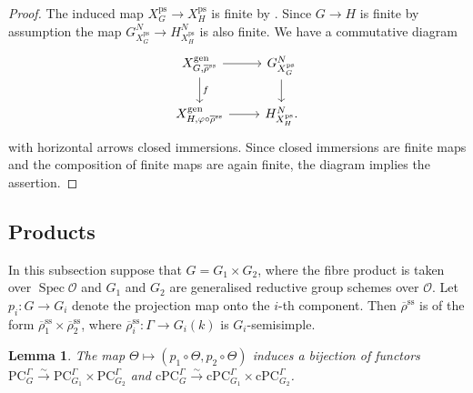 \documentclass{amsart}
\newtheorem{lem}[prop]{Lemma}
\theoremstyle{definition}
\theoremstyle{remark}
\DeclareMathOperator{\Spec}{Spec}
\newcommand{\OO}{\mathcal O}
\newcommand{\rhobar}{\overline{\rho}}
\newcommand{\ps}{\mathrm{ps}}
\newcommand{\gen}{\mathrm{gen}}
\newcommand{\rhobarss}{\rhobar^{\mathrm{ss}}}
\newcommand{\PC}{\mathrm{PC}}
\newcommand{\cPC}{\mathrm{cPC}}
\begin{document}
\begin{proof} The induced map $X^{\ps}_G \rightarrow X^{\ps}_H$ is finite by . Since 
$G\rightarrow H$ is finite by assumption the map $G^N_{X^{\ps}_G}\rightarrow H^N_{X^{\ps}_H}$ is also 
finite. We have a commutative diagram 
\begin{equation}\label{val_prop_gen}
        \begin{tikzcd}
            X^{\gen}_{G, \rhobarss} \ar[r]\ar[d, "f"]  & G^N_{X^{\ps}_G}\ar[d]\\
            X^{\gen}_{H, \varphi\circ\rhobarss}  \ar[r] & H^N_{X^{\ps}_H}.
            \end{tikzcd}
\end{equation}
with horizontal arrows closed immersions. Since closed immersions are finite maps and the 
composition of finite maps are again finite, the diagram implies the assertion.
\end{proof}

 

\subsection{Products}\label{sec_prod}
In this subsection suppose that $G=G_1\times G_2$, where the fibre product is taken over
$\Spec \OO$ and $G_1$ and $G_2$ are generalised reductive group schemes over $\OO$. 
Let $p_i: G\rightarrow G_i$ denote the projection map onto the $i$-th component. 
Then $\rhobarss$ is of the form $\rhobarss_1\times \rhobarss_2$, where $\rhobarss_i: \Gamma\rightarrow G_i(k)$
is $G_i$-semisimple.

\begin{lem}\label{prodPC} The map $\Theta\mapsto (p_1\circ \Theta, p_2\circ \Theta)$ induces a bijection of functors $\PC_G^{\Gamma}\overset{\sim}{\rightarrow} \PC_{G_1}^{\Gamma}\times \PC_{G_2}^{\Gamma}$ and 
$\cPC_G^{\Gamma}\overset{\sim}{\rightarrow}\cPC_{G_1}^{\Gamma}\times \cPC_{G_2}^{\Gamma}$.
\end{lem}
\end{document}
